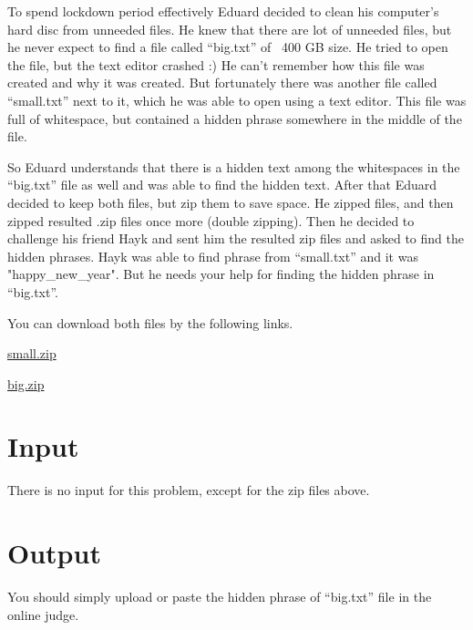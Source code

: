 To spend lockdown period effectively Eduard decided to clean his computer's hard disc from unneeded files.
He knew that there are lot of unneeded files, but he never expect to find a file called ``big.txt'' of ~400 GB size.
He tried to open the file, but the text editor crashed :)
He can't remember how this file was created and why it was created.
But fortunately there was another file called ``small.txt'' next to it, which he was able to open using a text editor.
This file was full of whitespace, but contained a hidden phrase somewhere in the middle of the file.

So Eduard understands that there is a hidden text among the whitespaces in the ``big.txt'' file as well and was able to find the hidden text.
After that Eduard decided to keep both files, but zip them to save space.
He zipped files, and then zipped resulted .zip files once more (double zipping).
Then he decided to challenge his friend Hayk and sent him the resulted zip files and asked to find the hidden phrases.
Hayk was able to find phrase from ``small.txt'' and it was "happy\_new\_year".
But he needs your help for finding the hidden phrase in ``big.txt''.

You can download both files by the following links.

\begin{center}
    \href{http://167.71.248.201/ejudge/small.zip}{small.zip}
    
    \href{http://167.71.248.201/ejudge/big.zip}{big.zip}
\end{center}

\section*{Input}
There is no input for this problem, except for the zip files above.

\section*{Output}
You should simply upload or paste the hidden phrase of ``big.txt'' file in the online judge.
